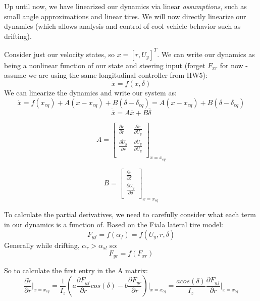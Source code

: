 

Up until now, we have linearized our dynamics via linear \textit{assumptions}, such as small angle approximations and linear tires. We will now directly linearize our dynamics (which allows analysis and control of cool vehicle behavior such as drifting). 

Consider just our velocity states, so $x = [r, U_y]^T$. We can write our dynamics as being a nonlinear function of our state and steering input (forget $F_{xr}$ for now - assume we are using the same longitudinal controller from HW5):
$$ \dot{x} = f(x,\delta)$$
We can linearize the dynamics and write our system as: 
$$\dot{x} = f(x_{eq}) + A(x-x_{eq}) + B(\delta-\delta_{eq})= A(x-x_{eq}) + B(\delta-\delta_{eq})$$
$$ \dot{\bar{x}} = A\bar{x} + B\bar{\delta} $$


\begin{equation}
A = 
\begin{bmatrix}
\frac{\partial \dot r}{\partial r}  & \frac{\partial \dot r}{\partial U_y} \\
\frac{\partial \dot U_y}{\partial r}  & \frac{\partial \dot U_y}{\partial U_y}\\
\end{bmatrix}_{x=x_{eq}} 
\end{equation}

\begin{equation}
B = \begin{bmatrix}
\frac{\partial \dot r}{\partial \delta} \\
\frac{\partial \dot U_y}{\partial \delta}\\
\end{bmatrix}_{x=x_{eq}} 
\end{equation}

To calculate the partial derivatives, we need to carefully consider what each term in our dynamics is a function of. Based on the Fiala lateral tire model:
$$F_{yf} = f(\alpha_f)=f(U_y, r, \delta)$$
Generally while drifting, $\alpha_r > \alpha_{sl}$ so:
$$F_{yr} = f(F_{xr})$$

So to calculate the first entry in the A matrix:
$$ \frac{\partial \dot r}{\partial r} \biggr\rvert_{x=x_{eq}} = \frac{1}{I_z}(a\frac{\partial F_{yf}}{\partial r}cos(\delta)-b\frac{\partial F_{yr}}{\partial r}) \biggr\rvert_{x=x_{eq}} = \frac{acos(\delta)}{I_z}\frac{\partial F_{yf}}{\partial r} \biggr\rvert_{x=x_{eq}}$$

